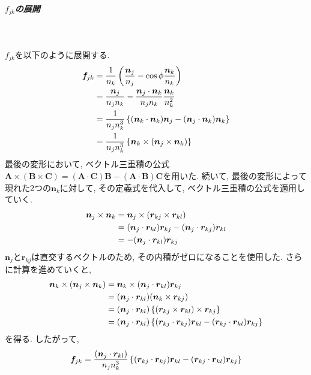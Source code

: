\subparagraph{$f_{jk}$の展開} \

$f_{jk}$を以下のように展開する. 
\begin{align}
    \bm{f}_{jk}
 &=
    \frac{1}{n_k}
    \left(
           \frac{\bm{n}_{j}}{n_{j}} - \cos\phi \frac{\bm{n}_{k}}{n_{k}}
    \right)
 \notag
 \\
 &=
    \frac{\bm{n}_{j}}{n_{j}n_{k}}
   -\frac{\bm{n}_{j} \cdot \bm{n}_{k}}{n_{j}n_{k}}
    \frac{\bm{n}_{k}}{n_{k}^{2}}
 \notag
 \\
 &=
    \frac{1}{n_{j}n_{k}^{3}}
    \left\{
            (\bm{n}_{k} \cdot \bm{n}_{k}) \bm{n}_{j}
           -(\bm{n}_{j} \cdot \bm{n}_{k}) \bm{n}_{k}
    \right\}
 \notag
 \\
 &=
    \frac{1}{n_{j}n_{k}^{3}}
    \left\{
            \bm{n}_{k} \times (\bm{n}_{j} \times \bm{n}_{k})
    \right\}
 \notag
\end{align}
最後の変形において, ベクトル三重積の公式
$\bm{A} \times (\bm{B} \times \bm{C}) = (\bm{A} \cdot \bm{C})\bm{B}
 - (\bm{A} \cdot \bm{B})\bm{C}$を用いた.
続いて, 最後の変形によって現れた2つの$\bm{n}_{k}$に対して, 
その定義式を代入して, ベクトル三重積の公式を適用していく. 
\begin{align}
    \bm{n}_{j} \times \bm{n}_{k}
 &=
    \bm{n}_{j} \times (\bm{r}_{kj} \times \bm{r}_{kl})
 \notag
 \\
 &=
    (\bm{n}_{j} \cdot \bm{r}_{kl}) \bm{r}_{kj}
   -(\bm{n}_{j} \cdot \bm{r}_{kj}) \bm{r}_{kl}
 \notag
 \\
 &=
   -(\bm{n}_{j} \cdot \bm{r}_{kl}) \bm{r}_{kj}
 \notag
\end{align}
$\bm{n}_{j}$と$\bm{r}_{kj}$は直交するベクトルのため, その内積がゼロになることを使用した. 
さらに計算を進めていくと, 
\begin{align}
    \bm{n}_{k} \times (\bm{n}_{j} \times \bm{n}_{k})
 &=
    \bm{n}_{k} \times (\bm{n}_{j} \cdot \bm{r}_{kl}) \bm{r}_{kj}
 \notag
 \\
 &=
    (\bm{n}_{j} \cdot \bm{r}_{kl})
    (\bm{n}_{k} \times \bm{r}_{kj})
 \notag
 \\
 &=
   (\bm{n}_{j} \cdot \bm{r}_{kl})
   \left\{
          (\bm{r}_{kj} \times \bm{r}_{kl}) \times \bm{r}_{kj}
   \right\}
 \notag
 \\
 &=
   (\bm{n}_{j} \cdot \bm{r}_{kl})
   \left\{
           (\bm{r}_{kj} \cdot \bm{r}_{kj}) \bm{r}_{kl}
          -(\bm{r}_{kj} \cdot \bm{r}_{kl}) \bm{r}_{kj}
   \right\}
 \notag
\end{align}
を得る. 
したがって, 
\begin{align}
  \bm{f}_{jk}
 =
  \frac{(\bm{n}_{j} \cdot \bm{r}_{kl})}{n_{j}n_{k}^{3}}
  \left\{
          (\bm{r}_{kj} \cdot \bm{r}_{kj}) \bm{r}_{kl}
         -(\bm{r}_{kj} \cdot \bm{r}_{kl}) \bm{r}_{kj}
  \right\}
 \notag
\end{align}
